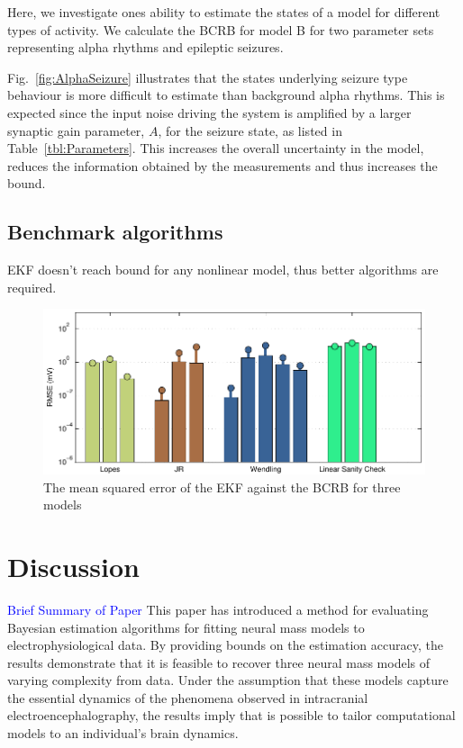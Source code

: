 \documentclass{article}
\newcommand{\brian}[1]{\textcolor{blue}{#1}}
\begin{document}
Here, we investigate ones ability to estimate the states of a model for different types of activity. We calculate the BCRB for model B for two parameter sets representing alpha rhythms and epileptic seizures.

Fig.~\ref{fig:AlphaSeizure} illustrates that the states underlying seizure type behaviour is more difficult to estimate than background alpha rhythms. This is expected since the input noise driving the system is amplified by a larger synaptic gain parameter, $A$, for the seizure state, as listed in Table~\ref{tbl:Parameters}. This increases the overall uncertainty in the model, reduces the information obtained by the measurements and thus increases the bound.

\subsection{Benchmark algorithms}

EKF doesn't reach bound for any nonlinear model, thus better algorithms are required.

\begin{figure}[ht]
  \begin{center}
    \includegraphics{./figures/pdf/CRBbar}
  \end{center}
  \caption{The mean squared error of the EKF against the BCRB for three models}
  \label{fig:CrbBar}
\end{figure}


\section{Discussion}
\brian{Brief Summary of Paper}
This paper has introduced a method for evaluating Bayesian estimation algorithms for fitting neural mass models to electrophysiological data. By providing bounds on the estimation accuracy, the results demonstrate that it is feasible to recover three neural mass models of varying complexity from data. Under the assumption that these models capture the essential dynamics of the phenomena observed in intracranial electroencephalography, the results imply that is possible to tailor computational models to an individual's brain dynamics. 
\end{document}
